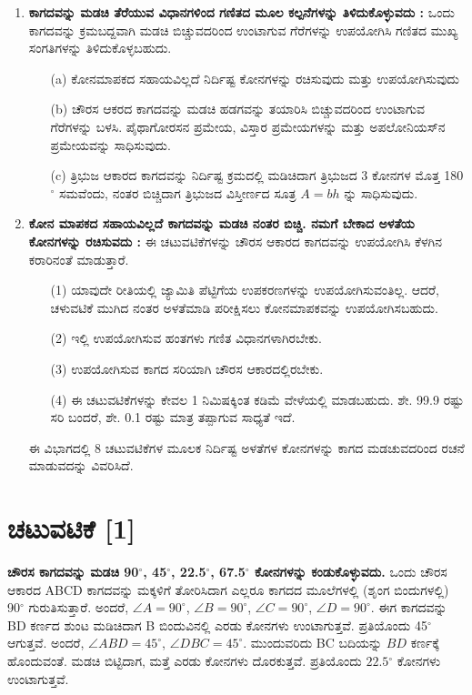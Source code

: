 \begin{enumerate}
\item  \textbf{ಕಾಗದವನ್ನು ಮಡಚಿ ತೆರೆಯುವ ವಿಧಾನಗಳಿಂದ ಗಣಿತದ ಮೂಲ ಕಲ್ಪನೆಗಳನ್ನು ತಿಳಿದುಕೊಳ್ಳುವದು :} ಒಂದು ಕಾಗದವನ್ನು ಕ್ರಮಬದ್ದವಾಗಿ ಮಡಚಿ ಬಿಚ್ಚುವದರಿಂದ ಉಂಟಾಗುವ ಗೆರೆಗಳನ್ನು ಉಪಯೋಗಿಸಿ ಗಣಿತದ ಮುಖ್ಯ ಸಂಗತಿಗಳನ್ನು ತಿಳಿದುಕೊಳ್ಳಬಹುದು.
\smallskip
\begin{itemize}
\item[(a)]  ಕೋನಮಾಪಕದ ಸಹಾಯವಿಲ್ಲದೆ ನಿರ್ದಿಷ್ಟ ಕೋನಗಳನ್ನು ರಚಿಸುವುದು ಮತ್ತು ಉಪಯೋಗಿಸುವುದು 

\smallskip
\item[(b)] ಚೌರಸ ಆಕರದ ಕಾಗದವನ್ನು ಮಡಚಿ ಹಡಗವನ್ನು ತಯಾರಿಸಿ ಬಿಚ್ಚುವದರಿಂದ ಉಂಟಾಗುವ ಗೆರೆಗಳನ್ನು ಬಳಸಿ. ಪೈಥಾಗೋರಸನ ಪ್ರಮೇಯ, ವಿಸ್ತಾರ  ಪ್ರಮೇಯಗಳನ್ನು ಮತ್ತು ಅಪಲೋನಿಯಸ್‌ನ ಪ್ರಮೇಯವನ್ನು ಸಾಧಿಸುವುದು. 

\smallskip
\item[(c)] ತ್ರಿಭುಜ ಆಕಾರದ ಕಾಗದವನ್ನು ನಿರ್ದಿಷ್ಟ ಕ್ರಮದಲ್ಲಿ ಮಡಿಚಿದಾಗ ತ್ರಿಭುಜದ 3 ಕೋನಗಳ ಮೊತ್ತ  180$^{\circ}$ ಸಮವೆಂದು, ನಂತರ ಬಿಚ್ಚಿದಾಗ ತ್ರಿಭುಜದ ವಿಸ್ತೀರ್ಣದ ಸೂತ್ರ $A=bh$ ನ್ನು ಸಾಧಿಸುವುದು. 
\end{itemize}

\eject

\item  \textbf{ಕೋನ ಮಾಪಕದ ಸಹಾಯವಿಲ್ಲದೆ ಕಾಗದವನ್ನು ಮಡಚಿ ನಂತರ ಬಿಚ್ಚಿ. ನಮಗೆ ಬೇಕಾದ ಅಳತೆಯ ಕೋನಗಳನ್ನು ರಚಿಸುವದು :} ಈ ಚಟುವಟಿಕೆಗಳನ್ನು ಚೌರಸ ಆಕಾರದ ಕಾಗದವನ್ನು ಉಪಯೋಗಿಸಿ ಕೆಳಗಿನ ಕರಾರಿನಂತೆ ಮಾಡುತ್ತಾರೆ. 
\smallskip
\begin{itemize}
\item[(1)] ಯಾವುದೇ ರೀತಿಯಲ್ಲಿ ಜ್ಯಾಮಿತಿ ಪೆಟ್ಟಿಗೆಯ ಉಪಕರಣಗಳನ್ನು ಉಪಯೋಗಿಸುವಂತಿಲ್ಲ. ಆದರೆ, ಚಳುವಟಿಕೆ ಮುಗಿದ ನಂತರ ಅಳತೆಮಾಡಿ ಪರೀಕ್ಷಿಸಲು ಕೋನಮಾಪಕವನ್ನು ಉಪಯೋಗಿಸಬಹುದು.

\smallskip
\item[(2)] ಇಲ್ಲಿ ಉಪಯೋಗಿಸುವ ಹಂತಗಳು ಗಣಿತ  ವಿಧಾನಗಳಾಗಿರಬೇಕು.

\smallskip
\item[(3)] ಉಪಯೋಗಿಸುವ ಕಾಗದ ಸರಿಯಾಗಿ ಚೌರಸ ಆಕಾರದಲ್ಲಿರಬೇಕು.

\smallskip
\item[(4)] ಈ ಚಟುವಟಿಕೆಗಳನ್ನು ಕೇವಲ 1 ನಿಮಿಷಕ್ಕಿಂತ ಕಡಿಮೆ ವೇಳೆಯಲ್ಲಿ ಮಾಡಬಹುದು. ಶೇ.  99.9 ರಷ್ಟು ಸರಿ ಬಂದರೆ, ಶೇ.  0.1 ರಷ್ಟು ಮಾತ್ರ ತಪ್ಪಾಗುವ ಸಾಧ್ಯತೆ ಇದೆ. 
\end{itemize}

ಈ ವಿಭಾಗದಲ್ಲಿ 8 ಚಟುವಟಿಕೆಗಳ ಮೂಲಕ ನಿರ್ದಿಷ್ಟ ಅಳತೆಗಳ ಕೋನಗಳನ್ನು ಕಾಗದ ಮಡಚುವದರಿಂದ ರಚನೆ ಮಾಡುವದನ್ನು ವಿವರಿಸಿದೆ. 
\end{enumerate}

\section*{ಚಟುವಟಿಕೆ [1]}
\textbf{ಚೌರಸ ಕಾಗದವನ್ನು ಮಡಚಿ 90$^\circ$,  45$^\circ$, 22.5$^\circ$, 67.5$^\circ$ ಕೋನಗಳನ್ನು ಕಂಡುಕೊಳ್ಳುವದು.} ಒಂದು ಚೌರಸ ಆಕಾರದ ABCD ಕಾಗದವನ್ನು ಮಕ್ಕಳಿಗೆ ತೋರಿಸಿದಾಗ ಎಲ್ಲರೂ ಕಾಗದದ ಮೂಲೆಗಳಲ್ಲಿ (ಶೃಂಗ ಬಿಂದುಗಳಲ್ಲಿ) 90$^\circ$ ಗುರುತಿಸುತ್ತಾರೆ. ಅಂದರೆ, $\angle{A} = 90^\circ$, $\angle{B} = 90^\circ$, $\angle{C} = 90^\circ$, $\angle{D} = 90^\circ$. ಈಗ ಕಾಗದವನ್ನು BD ಕರ್ಣದ ಶುಂಟ ಮಡಿಚಿದಾಗ B ಬಿಂದುವಿನಲ್ಲಿ ಎರಡು ಕೋನಗಳು ಉಂಟಾಗುತ್ತವೆ. ಪ್ರತಿಯೊಂದು  45$^\circ$ ಆಗುತ್ತವೆ. ಅಂದರೆ,  $\angle ABD=45^{\circ}$,  $\angle DBC = 45^\circ$. ಮುಂದುವರಿದು  BC ಬದಿಯನ್ನು $BD$ ಕರ್ಣಕ್ಕೆ ಹೊಂದುವಂತೆ. ಮಡಚಿ ಬಿಟ್ಟಿದಾಗ, ಮತ್ತೆ ಎರಡು ಕೋನಗಳು ದೊರಕುತ್ತವೆ. ಪ್ರತಿಯೊಂದು $22.5{^\circ}$ ಕೋನಗಳು ಉಂಟಾಗುತ್ತವೆ. 

